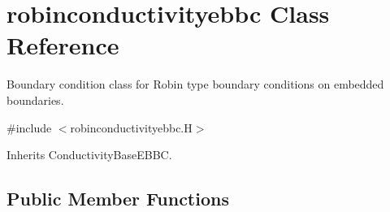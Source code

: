 \hypertarget{classrobinconductivityebbc}{}\section{robinconductivityebbc Class Reference}
\label{classrobinconductivityebbc}


Boundary condition class for Robin type boundary conditions on embedded boundaries.  




{\ttfamily \#include $<$robinconductivityebbc.\+H$>$}



Inherits Conductivity\+Base\+E\+B\+BC.

\subsection*{Public Member Functions}
